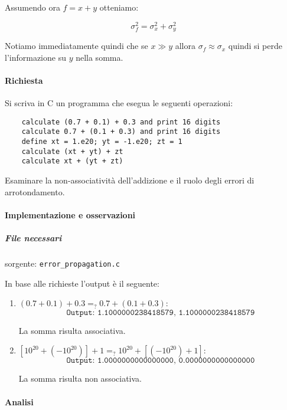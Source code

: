 Assumendo ora $f = x + y$ otteniamo:

$$
	\sigma_f^2 = {\sigma_x^2 + \sigma_y^2}
$$

Notiamo immediatamente quindi che se $x \gg y $ allora $\sigma_f \approx \sigma_x$ quindi
si perde l'informazione su $y$ nella somma.


\paragraph{Richiesta} 

Si scriva in C un programma che esegua le seguenti operazioni:

\begin{lstlisting}
    calculate (0.7 + 0.1) + 0.3 and print 16 digits
    calculate 0.7 + (0.1 + 0.3) and print 16 digits
    define xt = 1.e20; yt = -1.e20; zt = 1
    calculate (xt + yt) + zt
    calculate xt + (yt + zt)
\end{lstlisting}

Esaminare la non-associatività dell'addizione e il ruolo degli errori di arrotondamento.



\paragraph{Implementazione e osservazioni}

\subparagraph{File necessari} sorgente: \texttt{error\_propagation.c}

In base alle richieste l'output è il seguente:

\begin{enumerate}

	\item $(0.7 + 0.1) + 0.3 =_? 0.7 + (0.1 + 0.3)$:
	      $$\texttt{Output: 1.1000000238418579, 1.1000000238418579}$$

	      La somma risulta associativa.

	\item $[10^{20} + (-10^{20})] + 1 =_? 10^{20} + [(-10^{20}) + 1]$:
	      $$\texttt{Output: 1.0000000000000000, 0.0000000000000000}$$

	      La somma risulta non associativa.
\end{enumerate}

\label{sec:propagation}
\paragraph{Analisi}

